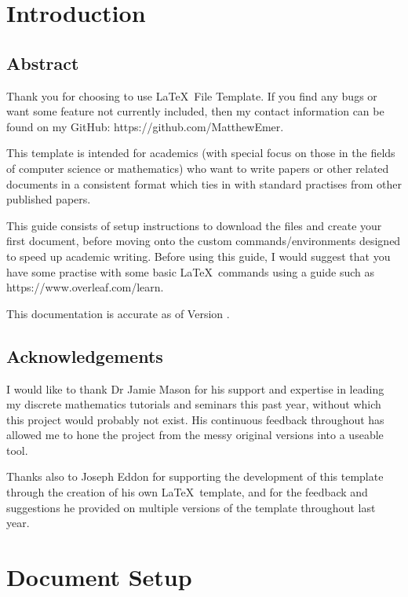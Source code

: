 \section{Introduction}

\subsection*{Abstract}

Thank you for choosing to use \LaTeX\ File Template. If you find any bugs or want some feature not currently included, then my contact information can be found on my GitHub: https://github.com/MatthewEmer.

This template is intended for academics (with special focus on those in the fields of computer science or mathematics) who want to write papers or other related documents in a consistent format which ties in with standard practises from other published papers. 

This guide consists of setup instructions to download the files and create your first document, before moving onto the custom commands/environments designed to speed up academic writing. Before using this guide, I would suggest that you have some practise with some basic \LaTeX\ commands using a guide such as https://www.overleaf.com/learn.

This documentation is accurate as of Version \templateversion.

\subsection*{Acknowledgements}

I would like to thank Dr Jamie Mason for his support and expertise in leading my discrete mathematics tutorials and seminars this past year, without which this project would probably not exist. His continuous feedback throughout has allowed me to hone the project from the messy original versions into a useable tool.

Thanks also to Joseph Eddon for supporting the development of this template through the creation of his own \LaTeX\ template, and for the feedback and suggestions he provided on multiple versions of the template throughout last year.

\newpage\section{Document Setup}

